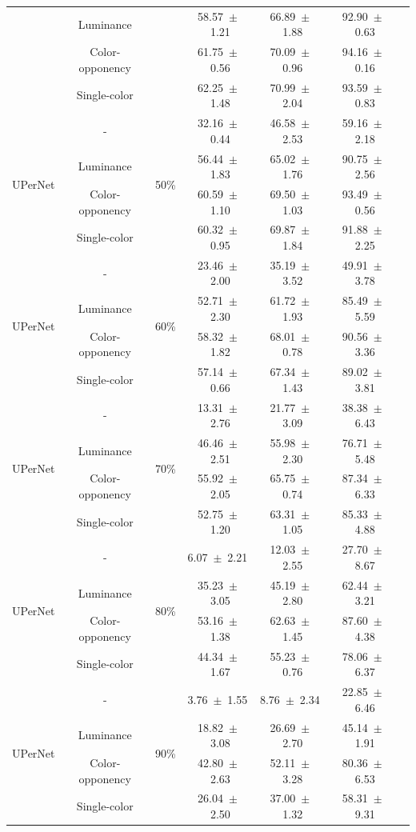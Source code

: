 \begin{table}[h]
\begin{tabular}{@{}lccc ccc@{}}
& Luminance & & 58.57~$\pm$~1.21 & 66.89~$\pm$~1.88 & 92.90~$\pm$~0.63 \\
& Color-opponency & & 61.75~$\pm$~0.56 & 70.09~$\pm$~0.96 & 94.16~$\pm$~0.16 \\
& Single-color & & 62.25~$\pm$~1.48 & 70.99~$\pm$~2.04 & 93.59~$\pm$~0.83 \\
\midrule
\multirow{4}{*}{UPerNet} & - & \multirow{4}{*}{50\%} & 32.16~$\pm$~0.44 & 46.58~$\pm$~2.53 & 59.16~$\pm$~2.18 \\
& Luminance & & 56.44~$\pm$~1.83 & 65.02~$\pm$~1.76 & 90.75~$\pm$~2.56 \\
& Color-opponency & & 60.59~$\pm$~1.10 & 69.50~$\pm$~1.03 & 93.49~$\pm$~0.56 \\
& Single-color & & 60.32~$\pm$~0.95 & 69.87~$\pm$~1.84 & 91.88~$\pm$~2.25 \\
\midrule
\multirow{4}{*}{UPerNet} & - & \multirow{4}{*}{60\%} & 23.46~$\pm$~2.00 & 35.19~$\pm$~3.52 & 49.91~$\pm$~3.78 \\
& Luminance & & 52.71~$\pm$~2.30 & 61.72~$\pm$~1.93 & 85.49~$\pm$~5.59 \\
& Color-opponency & & 58.32~$\pm$~1.82 & 68.01~$\pm$~0.78 & 90.56~$\pm$~3.36 \\
& Single-color & & 57.14~$\pm$~0.66 & 67.34~$\pm$~1.43 & 89.02~$\pm$~3.81 \\
\midrule
\multirow{4}{*}{UPerNet} & - & \multirow{4}{*}{70\%} & 13.31~$\pm$~2.76 & 21.77~$\pm$~3.09 & 38.38~$\pm$~6.43 \\
& Luminance & & 46.46~$\pm$~2.51 & 55.98~$\pm$~2.30 & 76.71~$\pm$~5.48 \\
& Color-opponency & & 55.92~$\pm$~2.05 & 65.75~$\pm$~0.74 & 87.34~$\pm$~6.33 \\
& Single-color & & 52.75~$\pm$~1.20 & 63.31~$\pm$~1.05 & 85.33~$\pm$~4.88 \\
\midrule
\multirow{4}{*}{UPerNet} & - & \multirow{4}{*}{80\%} & 6.07~$\pm$~2.21 & 12.03~$\pm$~2.55 & 27.70~$\pm$~8.67 \\
& Luminance & & 35.23~$\pm$~3.05 & 45.19~$\pm$~2.80 & 62.44~$\pm$~3.21 \\
& Color-opponency & & 53.16~$\pm$~1.38 & 62.63~$\pm$~1.45 & 87.60~$\pm$~4.38 \\
& Single-color & & 44.34~$\pm$~1.67 & 55.23~$\pm$~0.76 & 78.06~$\pm$~6.37 \\
\midrule
\multirow{4}{*}{UPerNet} & - & \multirow{4}{*}{90\%} & 3.76~$\pm$~1.55 & 8.76~$\pm$~2.34 & 22.85~$\pm$~6.46 \\
& Luminance & & 18.82~$\pm$~3.08 & 26.69~$\pm$~2.70 & 45.14~$\pm$~1.91 \\
& Color-opponency & & 42.80~$\pm$~2.63 & 52.11~$\pm$~3.28 & 80.36~$\pm$~6.53 \\
& Single-color & & 26.04~$\pm$~2.50 & 37.00~$\pm$~1.32 & 58.31~$\pm$~9.31 \\
\midrule
\bottomrule
\end{tabular}
\label{tab:sparse_results_upernet_cityscapes}
\end{table}